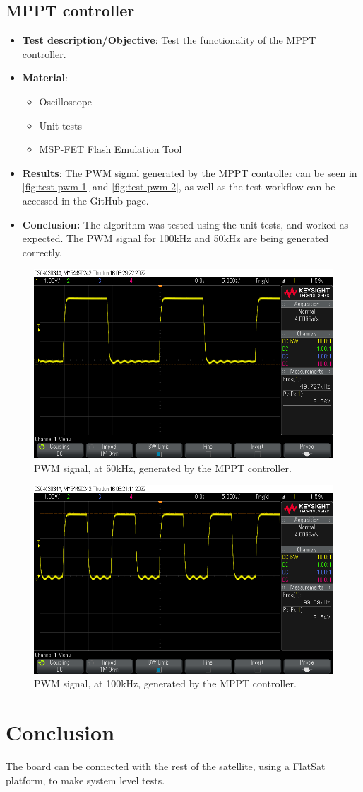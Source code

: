 \subsection{MPPT controller}

\begin{itemize}
    \item \textbf{Test description/Objective}: Test the functionality of the MPPT controller.
    \item \textbf{Material}:
        \begin{itemize}
            \item Oscilloscope
            \item Unit tests
            \item MSP-FET Flash Emulation Tool
        \end{itemize}
    \item \textbf{Results}: The PWM signal generated by the MPPT controller can be seen in \autoref{fig:test-pwm-1} and \autoref{fig:test-pwm-2}, as well as the test workflow can be accessed in the GitHub page.
    \item \textbf{Conclusion:} The algorithm was tested using the unit tests, and worked as expected. The PWM signal for 100kHz and 50kHz are being generated correctly.  
\end{itemize}

\begin{figure}[!ht]
    \begin{center}
        \includegraphics[width=0.6\columnwidth]{figures/eps_pwm_50khz.png}
        \caption{PWM signal, at 50kHz, generated by the MPPT controller.}
        \label{fig:test-pwm-1}
    \end{center}
\end{figure}

\begin{figure}[!ht]
    \begin{center}
        \includegraphics[width=0.6\columnwidth]{figures/eps_pwm_100khz.png}
        \caption{PWM signal, at 100kHz, generated by the MPPT controller.}
        \label{fig:test-pwm-2}
    \end{center}
\end{figure}

\section{Conclusion} The board can be connected with the rest of the satellite, using a FlatSat platform, to make system level tests.
